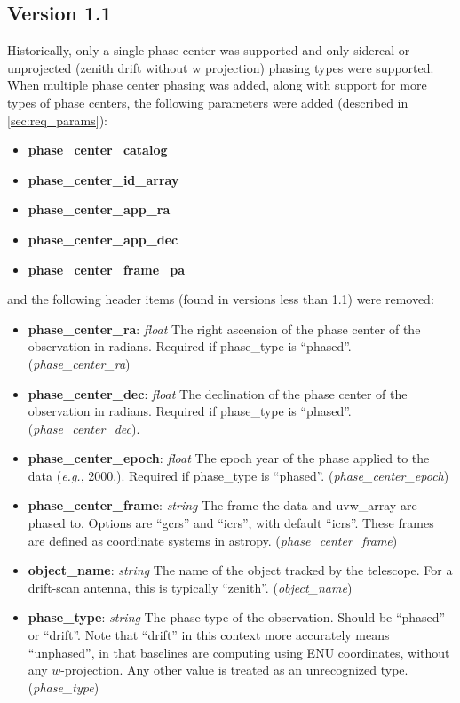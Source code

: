 \documentclass[11pt, oneside]{article}
\begin{document}
\subsection{Version 1.1}
Historically, only a single phase center was supported and only sidereal or
unprojected (zenith drift without w projection) phasing types were supported.
When multiple phase center phasing was added, along with support for more
types of phase centers, the following parameters were added (described in \ref{sec:req_params}):

\begin{itemize}
  \item \textbf{phase\_center\_catalog}
  \item \textbf{phase\_center\_id\_array}
  \item \textbf{phase\_center\_app\_ra}
  \item \textbf{phase\_center\_app\_dec}
  \item \textbf{phase\_center\_frame\_pa}
\end{itemize}

and the following header items (found in versions less than 1.1) were removed:

\begin{itemize}
    \item \textbf{phase\_center\_ra}: \textit{float} The right ascension of the
      phase center of the observation in radians. Required if phase\_type is
      ``phased''. (\textit{phase\_center\_ra})
    \item \textbf{phase\_center\_dec}: \textit{float} The declination of the phase
      center of the observation in radians. Required if phase\_type is
      ``phased''. (\textit{phase\_center\_dec}).
    \item \textbf{phase\_center\_epoch}: \textit{float} The epoch year of the phase
      applied to the data (\textit{e.g.}, 2000.). Required if phase\_type is
      ``phased''. (\textit{phase\_center\_epoch})
    \item \textbf{phase\_center\_frame}: \textit{string} The frame the data and
      uvw\_array are phased to. Options are ``gcrs'' and ``icrs'', with default
      ``icrs''. These frames are defined as
      \href{https://docs.astropy.org/en/stable/coordinates/index.html}{coordinate
        systems in astropy}. (\textit{phase\_center\_frame})
    \item \textbf{object\_name}: \textit{string} The name of the object tracked by
      the telescope. For a drift-scan antenna, this is typically
      ``zenith''. (\textit{object\_name})
    \item \textbf{phase\_type}: \textit{string} The phase type of the
      observation. Should be ``phased'' or ``drift''. Note that ``drift'' in this
      context more accurately means ``unphased'', in that baselines are computing
      using ENU coordinates, without any $w$-projection. Any other value is treated as
      an unrecognized type. (\textit{phase\_type})
\end{itemize}
\end{document}
